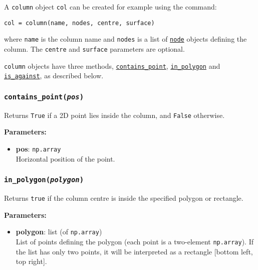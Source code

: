 A \texttt{column} object \texttt{col} can be created for example using the command:

\begin{lstlisting}
col = column(name, nodes, centre, surface)
\end{lstlisting}

where \texttt{name} is the column name and \texttt{nodes} is a list of \hyperref[nodeobjects]{\texttt{node}} objects defining the column.  The \texttt{centre} and \texttt{surface} parameters are optional.

\texttt{column} objects have three methods, \hyperref[sec:column:contains_point]{\texttt{contains\_point}}, \hyperref[sec:column:in_polygon]{\texttt{in\_polygon}} and \hyperref[sec:column:is_against]{\texttt{is\_against}}, as described below.

\begin{snugshade}
\subsubsection{\texttt{contains\_point(\emph{pos})}}
\end{snugshade}
\label{sec:column:contains_point}

Returns \texttt{True} if a 2D point lies inside the column, and \texttt{False} otherwise.

\textbf{Parameters:}
\begin{itemize}
\item \textbf{pos}: \texttt{np.array}\\
  Horizontal position of the point.
\end{itemize}

\begin{snugshade}
\subsubsection{\texttt{in\_polygon(\emph{polygon})}}
\end{snugshade}
\label{sec:column:in_polygon}

Returns \texttt{true} if the column centre is inside the specified polygon or rectangle.

\textbf{Parameters:}
\begin{itemize}
\item \textbf{polygon}: list (of \texttt{np.array})\\
  List of points defining the polygon (each point is a two-element \texttt{np.array}).  If the list has only two points, it will be interpreted as a rectangle [bottom left, top right].
\end{itemize}


